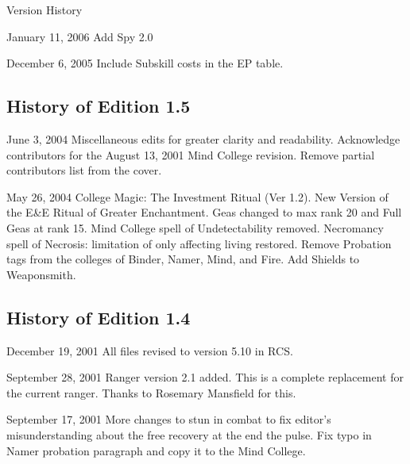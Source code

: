 \begin{Chapter}{Version History}
\begin{Description}
\item[January 11, 2006] Add Spy 2.0 

\item[December 6, 2005] Include Subskill costs in the EP table.

\end{Description}

\subsection{History of Edition 1.5}

\begin{Description}

\item[June 3, 2004] Miscellaneous edits for greater clarity and
  readability.  Acknowledge contributors for the August 13, 2001 Mind
  College revision.  Remove partial contributors list from the
  cover.

\item[May 26, 2004] College Magic: The Investment Ritual (Ver 1.2).
  New Version of the E\&E Ritual of Greater Enchantment.  Geas changed
  to max rank 20 and Full Geas at rank 15.  Mind College spell of
  Undetectability removed.  Necromancy spell of Necrosis: limitation
  of only affecting living restored. Remove Probation tags from the
  colleges of Binder, Namer, Mind, and Fire.  Add Shields to
  Weaponsmith.

\end{Description}

\subsection{History of Edition 1.4}

\begin{Description}

\item[December 19, 2001] All files revised to version 5.10 in RCS.

\item[September 28, 2001] Ranger version 2.1 added.  This is a
  complete replacement for the current ranger. Thanks to Rosemary
  Mansfield for this.

\item[September 17, 2001] More changes to stun in combat to fix
  editor’s misunderstanding about the free recovery at the end the
  pulse.  Fix typo in Namer probation paragraph and copy it to the
  Mind College.


\end{Description}
\end{Chapter}
